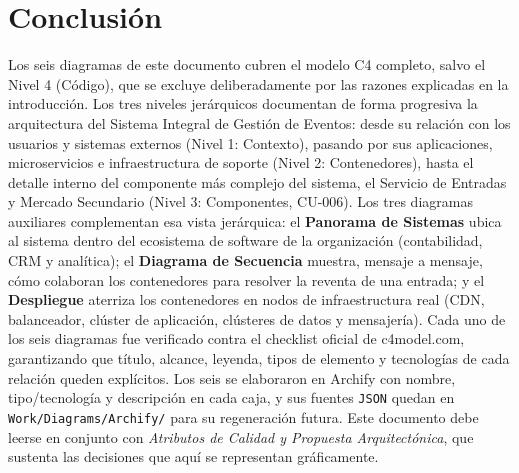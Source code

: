 \documentclass[12pt,a4paper]{article}
\begin{document}
\section{Conclusión}

Los seis diagramas de este documento cubren el modelo C4 completo, salvo el Nivel 4 (Código), que
se excluye deliberadamente por las razones explicadas en la introducción. Los tres niveles
jerárquicos documentan de forma progresiva la arquitectura del Sistema Integral de Gestión de
Eventos: desde su relación con los usuarios y sistemas externos (Nivel 1: Contexto), pasando por
sus aplicaciones, microservicios e infraestructura de soporte (Nivel 2: Contenedores), hasta el
detalle interno del componente más complejo del sistema, el Servicio de Entradas y Mercado
Secundario (Nivel 3: Componentes, CU-006). Los tres diagramas auxiliares complementan esa vista
jerárquica: el \textbf{Panorama de Sistemas} ubica al sistema dentro del ecosistema de software de
la organización (contabilidad, CRM y analítica); el \textbf{Diagrama de Secuencia} muestra, mensaje
a mensaje, cómo colaboran los contenedores para resolver la reventa de una entrada; y el
\textbf{Despliegue} aterriza los contenedores en nodos de infraestructura real (CDN, balanceador,
clúster de aplicación, clústeres de datos y mensajería). Cada uno de los seis diagramas fue
verificado contra el checklist oficial de c4model.com, garantizando que título, alcance, leyenda,
tipos de elemento y tecnologías de cada relación queden explícitos. Los seis se elaboraron en
Archify con nombre, tipo/tecnología y descripción en cada caja, y sus fuentes
\texttt{JSON} quedan en \texttt{Work/Diagrams/Archify/} para su regeneración futura. Este documento debe
leerse en conjunto con \textit{Atributos de Calidad y Propuesta Arquitectónica}, que sustenta las
decisiones que aquí se representan gráficamente.
\end{document}
